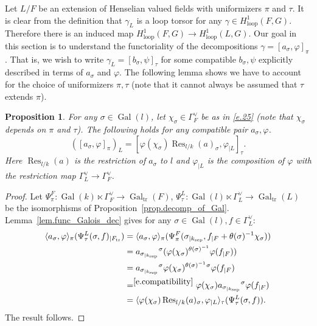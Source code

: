 \documentclass[12pt]{amsart}
\numberwithin{equation}{section}
\newtheorem{proposition}[theorem]{Proposition}
\theoremstyle{definition}
\newcommand{\Gal}{\operatorname{Gal}}
\newcommand{\sep}{\operatorname{sep}}
\newcommand{\tr}{\operatorname{tr}}
\newcommand{\Inf}{\operatorname{Res}}
\newcommand{\ksep}{k_{\sep}}
\newcommand{\Ftr}{F_{\tr}}
\newcommand{\vphi}{\varphi}
\newcommand{\Galtr}{\Gal_{\tr}}
\newcommand{\I}[1]{\Gamma_{#1}^{\vee}}
\newcommand{\lop}{\operatorname{loop}}
\begin{document}
Let $L/F$ be an extension of Henselian valued fields with uniformizers $\pi$ and $\tau$. It is clear from the definition that $\gamma_L$ is a loop torsor for any $\gamma\in H^1_{\lop}(F,G)$. Therefore there is an induced map $H^1_{\lop}(F,G)\to H^1_{\lop}(L,G)$. Our goal in this section is to understand the functoriality of the decompositions $\gamma = [a_\sigma,\vphi]_\pi$. That is, we wish to write $\gamma_L = [b_\sigma,\psi]_\tau$ for some compatible $b_\sigma,\psi$ explicitly described in terms of $a_\sigma$ and $\vphi$. The following lemma shows we have to account for the choice of uniformizers $\pi,\tau$ (note that it cannot always be assumed that $\tau$ extends $\pi$). 

\begin{proposition}\label{prop.basic_func_decomp}
    For any $\sigma\in \Gal(l)$, let $\chi_\sigma \in \I{F}$ be as in \eqref{e.25} (note that $\chi_\sigma$ depends on $\pi$ and $\tau$). The following holds for any compatible pair $a_\sigma,\vphi$.
     $$([a_\sigma,\vphi]_{\pi})_L = [\vphi(\chi_\sigma)\Inf_{l/k}(a)_\sigma ,\vphi_{|L}]_\tau.$$ 
     Here $\Inf_{l/k}(a)$ is the restriction of $a_\sigma$ to $l$ and $\vphi_{|L}$ is the composition of $\vphi$ with the restriction map $\I{L}\to \I{F}$.
\end{proposition}
\begin{proof}
    Let $\Psi^F_\pi: \Gal(k)\ltimes \I{F} \to \Galtr(F)$, $\Psi^L_\tau: \Gal(l)\ltimes \I{L} \to \Galtr(L)$ be the isomorphisms of Proposition~\ref{prop.decomp_of_Gal}. 
    Lemma~\ref{lem.func_Galois_dec} gives for any $\sigma\in \Gal(l),f\in \I{L}$:
    \begin{align*}
        \langle a_\sigma, \vphi\rangle_{\pi}(\Psi^L_\tau(\sigma,f)_{|\Ftr}) &= \langle a_\sigma, \vphi\rangle_{\pi}(\Psi^F_\pi(\sigma_{|\ksep},f_{|F} + \theta(\sigma)^{-1}\chi_\sigma)) \\
         &= a_{\sigma_{|\ksep}} {}^{\sigma} ( \vphi(\chi_\sigma)^{\theta(\sigma)^{-1}} \vphi(f_{|F})) \\
        &= a_{\sigma_{|\ksep}} {}^{\sigma}  \vphi(\chi_\sigma)^{\theta(\sigma)^{-1}} {}^{\sigma} \vphi(f_{|F}) \\
        &=^{\eqref{e.compatibility}} \vphi(\chi_\sigma) a_{\sigma_{|\ksep}} {}^{\sigma} \vphi(f_{|F}) \\
        &=\langle \vphi(\chi_\sigma) \Inf_{l/k}(a)_\sigma ,\vphi_{|L}\rangle_{\tau}(\Psi^L_\tau(\sigma,f)).
    \end{align*}
    The result follows.
\end{proof}
\end{document}

